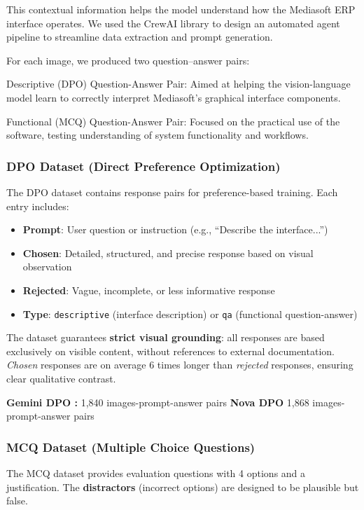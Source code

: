 \documentclass[10pt,conference,compsocconf]{IEEEtran}
\begin{document}
This contextual information helps the model understand how the Mediasoft ERP interface operates. We used the CrewAI library to design an automated agent pipeline to streamline data extraction and prompt generation.

For each image, we produced two question–answer pairs:

Descriptive (DPO) Question-Answer Pair:
Aimed at helping the vision-language model learn to correctly interpret Mediasoft’s graphical interface components.

Functional (MCQ) Question-Answer Pair:
Focused on the practical use of the software, testing understanding of system functionality and workflows.

\subsubsection{DPO Dataset (Direct Preference Optimization)}

The DPO dataset contains response pairs for preference-based training. Each entry includes:
\begin{itemize}
    \item \textbf{Prompt}: User question or instruction (e.g., ``Describe the interface...'')
    \item \textbf{Chosen}: Detailed, structured, and precise response based on visual observation
    \item \textbf{Rejected}: Vague, incomplete, or less informative response
    \item \textbf{Type}: \texttt{descriptive} (interface description) or \texttt{qa} (functional question-answer)
\end{itemize}

The dataset guarantees \textbf{strict visual grounding}: all responses are based exclusively on visible content, without references to external documentation. \textit{Chosen} responses are on average 6 times longer than \textit{rejected} responses, ensuring clear qualitative contrast.

\textbf{Gemini DPO :}  1,840 images-prompt-answer pairs 
\textbf{Nova DPO }  1,868 images-prompt-answer pairs

\subsubsection{MCQ Dataset (Multiple Choice Questions)}

The MCQ dataset provides evaluation questions with 4 options and a justification.
The \textbf{distractors} (incorrect options) are designed to be plausible but false.
\end{document}
